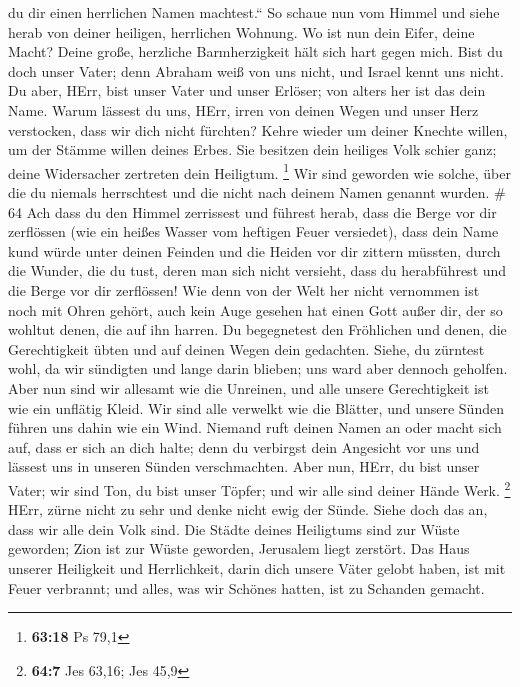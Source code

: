 du dir einen herrlichen Namen machtest.``  So schaue nun
vom Himmel und siehe herab von deiner heiligen, herrlichen Wohnung. Wo
ist nun dein Eifer, deine Macht? Deine große, herzliche Barmherzigkeit
hält sich hart gegen mich.  Bist du doch unser Vater; denn
Abraham weiß von uns nicht, und Israel kennt uns nicht. Du aber, HErr,
bist unser Vater und unser Erlöser; von alters her ist das dein Name.
 Warum lässest du uns, HErr, irren von deinen Wegen und
unser Herz verstocken, dass wir dich nicht fürchten? Kehre wieder um
deiner Knechte willen, um der Stämme willen deines Erbes. 
Sie besitzen dein heiliges Volk schier ganz; deine Widersacher zertreten
dein Heiligtum. \footnote{\textbf{63:18} Ps 79,1}  Wir sind
geworden wie solche, über die du niemals herrschtest und die nicht nach
deinem Namen genannt wurden. \# 64  Ach dass du den Himmel
zerrissest und führest herab, dass die Berge vor dir zerflössen (wie ein
heißes Wasser vom heftigen Feuer versiedet), dass dein Name kund würde
unter deinen Feinden und die Heiden vor dir zittern müssten,
 durch die Wunder, die du tust, deren man sich nicht
versieht, dass du herabführest und die Berge vor dir zerflössen!
 Wie denn von der Welt her nicht vernommen ist noch mit
Ohren gehört, auch kein Auge gesehen hat einen Gott außer dir, der so
wohltut denen, die auf ihn harren.  Du begegnetest den
Fröhlichen und denen, die Gerechtigkeit übten und auf deinen Wegen dein
gedachten. Siehe, du zürntest wohl, da wir sündigten und lange darin
blieben; uns ward aber dennoch geholfen.  Aber nun sind wir
allesamt wie die Unreinen, und alle unsere Gerechtigkeit ist wie ein
unflätig Kleid. Wir sind alle verwelkt wie die Blätter, und unsere
Sünden führen uns dahin wie ein Wind.  Niemand ruft deinen
Namen an oder macht sich auf, dass er sich an dich halte; denn du
verbirgst dein Angesicht vor uns und lässest uns in unseren Sünden
verschmachten.  Aber nun, HErr, du bist unser Vater; wir
sind Ton, du bist unser Töpfer; und wir alle sind deiner Hände Werk.
\footnote{\textbf{64:7} Jes 63,16; Jes 45,9}  HErr, zürne
nicht zu sehr und denke nicht ewig der Sünde. Siehe doch das an, dass
wir alle dein Volk sind.  Die Städte deines Heiligtums sind
zur Wüste geworden; Zion ist zur Wüste geworden, Jerusalem liegt
zerstört.  Das Haus unserer Heiligkeit und Herrlichkeit,
darin dich unsere Väter gelobt haben, ist mit Feuer verbrannt; und
alles, was wir Schönes hatten, ist zu Schanden gemacht. 
